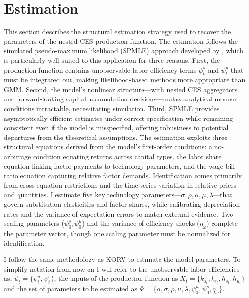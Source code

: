 \documentclass[12pt]{article}
\begin{document}



\section{Estimation}\label{sec:estimation}

This section describes the structural estimation strategy used to recover the parameters of the nested CES production function. The estimation follows the simulated pseudo-maximum likelihood (SPMLE) approach developed by \citet{white1996estimation}, which is particularly well-suited to this application for three reasons. First, the production function contains unobservable labor efficiency terms $\psi^s_t$ and $\psi^u_t$ that must be integrated out, making likelihood-based methods more appropriate than GMM. Second, the model's nonlinear structure---with nested CES aggregators and forward-looking capital accumulation decisions---makes analytical moment conditions intractable, necessitating simulation. Third, SPMLE provides asymptotically efficient estimates under correct specification while remaining consistent even if the model is misspecified, offering robustness to potential departures from the theoretical assumptions. The estimation exploits three structural equations derived from the model's first-order conditions: a no-arbitrage condition equating returns across capital types, the labor share equation linking factor payments to technology parameters, and the wage-bill ratio equation capturing relative factor demands. Identification comes primarily from cross-equation restrictions and the time-series variation in relative prices and quantities. I estimate five key technology parameters---$\sigma, \rho, \alpha, \mu, \lambda$---that govern substitution elasticities and factor shares, while calibrating depreciation rates and the variance of expectation errors to match external evidence. Two scaling parameters ($\psi^s_0, \psi^u_0$) and the variance of efficiency shocks ($\eta_\omega$) complete the parameter vector, though one scaling parameter must be normalized for identification.

I follow the same methodology as KORV to estimate the model parameters. To simplify notation from now on I will refer to the unobservable labor efficiencies as, $\psi_t = \{\psi^u_t, \psi^s_t\}$, the inputs of the production function as $X_t = \{ k_{s_t} , k_{e_t}, h_{s_t}, h_{u_t}\}$ and the set of parameters to be estimated as $\Phi = \{\alpha, \sigma, \rho, \mu, \lambda, \psi^u_0, \psi^s_0, \eta_\omega \}$.
\end{document}
